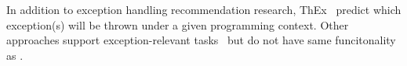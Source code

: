 In addition to exception handling recommendation research,
ThEx~\cite{throw-ase22} predict which exception(s) will be thrown
under a given programming context. Other approaches support
exception-relevant tasks~\cite{8595064,9462986,9700190} but do not
have same funcitonality as {\tool}.


